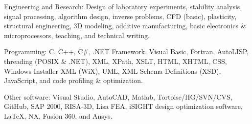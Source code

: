 \documentclass{resume}
\begin{document}
    \begin{bulletedlist}
		
        \item Engineering and Research: Design of laboratory experiments,
                        stability analysis,
                        signal processing,
                        algorithm design,
                        inverse problems,
                        CFD (basic),
                        plasticity,
                        structural engineering,
                        3D modeling,
                        additive manufacturing,
                        basic electronics \& microprocessors,
                        teaching,
                        and technical writing.
                        
        \item Programming: C,
                        C++,
                        C\#,
                        .NET Framework,
                        Visual Basic,
                        Fortran,
                        AutoLISP,
                        threading (POSIX \& .NET),
                        XML,
                        XPath,
                        XSLT,
                        HTML,
                        XHTML,
                        CSS,
                        Windows Installer XML (WiX),
                        UML,
                        XML Schema Definitions (XSD),
                        JavaScript,
                        and code profiling \& optimization.
                        
        \item Other software: Visual Studio,
                        AutoCAD,
                        Matlab,
                        Tortoise/HG/SVN/CVS,
                        GitHub,
                        SAP 2000,
                        RISA-3D,
                        Lisa FEA,
                        iSIGHT design optimization software,
                        LaTeX,
                        NX,
                        Fusion 360,
                        and Ansys.
                        
	\end{bulletedlist}
	

    
\end{document}
